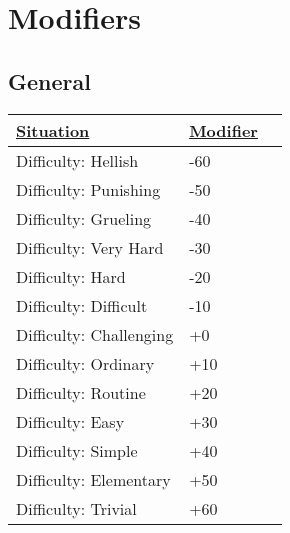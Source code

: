 \section{Modifiers}
\label{situationalmodifiers}
\subsection{General}
\begin{center}
	\begin{tabular}{|l|l|l|}
		\hline
		\ul{Situation}         & \ul{Modifier} \\ \hline
		Difficulty: Hellish     & -60            \\ \hline
		Difficulty: Punishing   & -50            \\ \hline
		Difficulty: Grueling    & -40            \\ \hline
		Difficulty: Very Hard   & -30            \\ \hline
		Difficulty: Hard        & -20            \\ \hline
		Difficulty: Difficult   & -10            \\ \hline
		Difficulty: Challenging & +0             \\ \hline
		Difficulty: Ordinary    & +10            \\ \hline
		Difficulty: Routine     & +20            \\ \hline
		Difficulty: Easy        & +30            \\ \hline
		Difficulty: Simple      & +40            \\ \hline
		Difficulty: Elementary  & +50            \\ \hline
		Difficulty: Trivial     & +60            \\ \hline
	\end{tabular}
\end{center}
